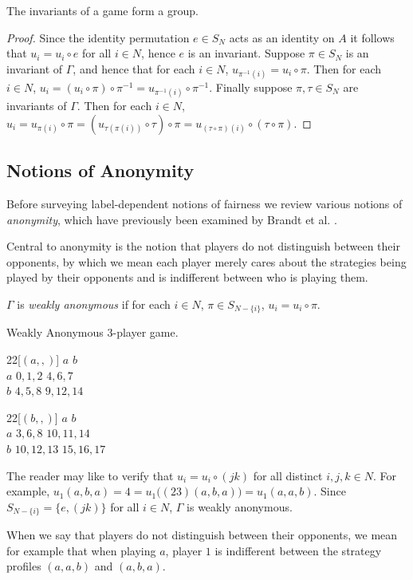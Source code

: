 \begin{lemma}
	The invariants of a game form a group.
	\begin{proof}
		Since the identity permutation $e \in S_N$ acts as an identity on $A$ it follows that $u_i = u_i \circ e$ for all $i \in N$, hence $e$ is an invariant. Suppose $\pi \in S_N$ is an invariant of $\Gamma$, and hence that for each $i \in N$, $u_{\pi^{-1}(i)} = u_i \circ \pi$. Then for each $i \in N$, $u_i = (u_i \circ \pi) \circ \pi^{-1} = u_{\pi^{-1}(i)} \circ \pi^{-1}$. Finally suppose $\pi, \tau \in S_N$ are invariants of $\Gamma$. Then for each $i \in N$, $u_i = u_{\pi(i)} \circ \pi = (u_{\tau(\pi(i))} \circ \tau) \circ \pi = u_{(\tau \circ \pi)(i)} \circ (\tau \circ \pi)$.
	\end{proof}
\end{lemma}

\subsection{Notions of Anonymity}
Before surveying label-dependent notions of fairness we review various notions of \textit{anonymity}, which have previously been examined by Brandt et al. \cite{brandt2009symmetries}. 

Central to anonymity is the notion that players do not distinguish between their opponents, by which we mean each player merely cares about the strategies being played by their opponents and is indifferent between who is playing them.

\begin{definition}
	$\Gamma$ is \textit{weakly anonymous} if for each $i \in N$, $\pi \in S_{N-\{i\}}$, $u_i = u_i \circ \pi$.
\end{definition}

\begin{example} \label{weaklyanoneg}
	Weakly Anonymous 3-player game.
	\begin{center}
	\begin{game}{2}{2}[$(a,,)$]
     \> $a$      \> $b$ \\
		$a$   \> $0,1,2$  \> $4,6,7$ \\
		$b$   \> $4,5,8$  \> $9,12,14$
	\end{game}
	\hspace*{10mm} 
	\begin{game}{2}{2}[$(b,,)$]
     \> $a$     \> $b$ \\
		$a$   \> $3,6,8$ \> $10,11,14$ \\
		$b$   \> $10,12,13$ \> $15,16,17$
	\end{game}
	\end{center}
	The reader may like to verify that $u_i = u_i \circ (jk)$ for all distinct $i, j, k \in N$. For example, $u_1(a,b,a) = 4 = u_1\bigl((23)(a,b,a)\bigr) = u_1(a,a,b)$. Since $S_{N-\{i\}} = \{e, (jk)\}$ for all $i \in N$, $\Gamma$ is weakly anonymous.
	
	When we say that players do not distinguish between their opponents, we mean for example that when playing $a$, player $1$ is indifferent between the strategy profiles $(a,a,b)$ and $(a,b,a)$.
\end{example}
	
